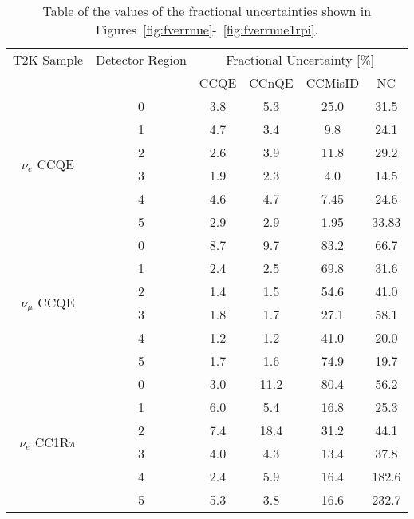 \begin{table}[h!]
  \centering
  \begin{tabular}{| c | c | c | c | c | c |}
    \hline\hline
    T2K Sample & Detector Region & \multicolumn{4}{|c|}{Fractional Uncertainty [\%] } \\
    \cline{3-6}
     &  & CCQE & CCnQE & CCMisID & NC \\
    \hline
    \multirow{6}{*}{$\nu_{e}$ CCQE}
      & 0 & 3.8 & 5.3 & 25.0 & 31.5  \\ 
      & 1 & 4.7 & 3.4 & 9.8  & 24.1  \\ 
      & 2 & 2.6 & 3.9 & 11.8 & 29.2  \\ 
      & 3 & 1.9 & 2.3 & 4.0  & 14.5  \\ 
      & 4 & 4.6 & 4.7 & 7.45 & 24.6  \\ 
      & 5 & 2.9 & 2.9 & 1.95 & 33.83 \\ 
      \hline
    \multirow{6}{*}{$\nu_{\mu}$ CCQE}
      & 0 & 8.7 & 9.7 & 83.2 & 66.7 \\ 
      & 1 & 2.4 & 2.5 & 69.8 & 31.6 \\ 
      & 2 & 1.4 & 1.5 & 54.6 & 41.0 \\ 
      & 3 & 1.8 & 1.7 & 27.1 & 58.1 \\ 
      & 4 & 1.2 & 1.2 & 41.0 & 20.0 \\ 
      & 5 & 1.7 & 1.6 & 74.9 & 19.7 \\ 
      \hline
    \multirow{6}{*}{$\nu_{e}$ CC1R$\pi$}
      & 0 & 3.0 & 11.2 & 80.4 & 56.2  \\ 
      & 1 & 6.0 & 5.4  & 16.8 & 25.3  \\ 
      & 2 & 7.4 & 18.4 & 31.2 & 44.1  \\ 
      & 3 & 4.0 & 4.3  & 13.4 & 37.8  \\ 
      & 4 & 2.4 & 5.9  & 16.4 & 182.6 \\ 
      & 5 & 5.3 & 3.8  & 16.6 & 232.7 \\ 
    \hline
  \end{tabular}
  \caption{Table of the values of the fractional uncertainties shown in
  Figures~\ref{fig:fverrnue}-~\ref{fig:fverrnue1rpi}.}
  \label{tab:fverrs}
\end{table}



